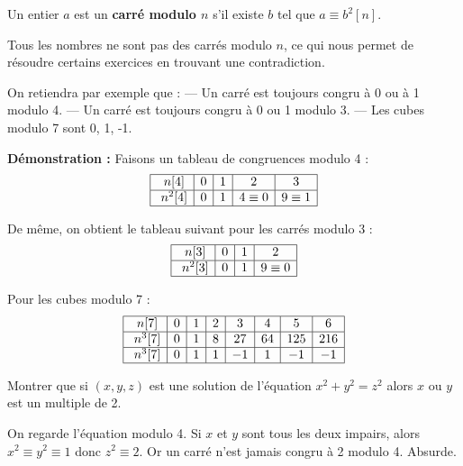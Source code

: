 \begin{dfn}
Un entier $a$ est un \textbf{carré modulo $n$} s'il existe $b$ tel que $a \equiv b^2[n]$.
\end{dfn}

Tous les nombres ne sont pas des carrés modulo $n$, ce qui nous permet de résoudre certains exercices en trouvant une contradiction.

\smallskip
On retiendra par exemple que :
\newline
— Un carré est toujours congru à 0 ou à 1 modulo 4.
\newline
— Un carré est toujours congru à 0 ou 1 modulo 3.
\newline
— Les cubes modulo 7 sont 0, 1, -1.

\bigskip
\textbf{Démonstration :}
\newline
Faisons un tableau de congruences modulo 4 :
$$\begin{array}{|c|c|c|c|c|}
\hline
\ n[4]&0&1&2&3 \\
\hline\ n^2[4]&0&1&4\equiv0&9\equiv1 \\
\hline
\end{array}$$
\newline

De même, on obtient le tableau suivant pour les carrés modulo 3 :
$$\begin{array}{|c|c|c|c|}
\hline
\ n[3]&0&1&2 \\
\hline\ n^2[3]&0&1&9\equiv0 \\
\hline
\end{array}$$
\newline

Pour les cubes modulo 7 :
$$\begin{array}{|c|c|c|c|c|c|c|c|}
\hline
\ n[7]&0&1&2&3&4&5&6 \\
\hline\ n^3[7]&0&1&8&27&64&125&216 \\
\hline\ n^3[7]&0&1&1&-1&1&-1&-1 \\
\hline
\end{array}$$

\begin{ex}
Montrer que si $(x, y, z)$ est une solution de l’équation $x^2+y^2=z^2$ alors $x$ ou $y$ est un multiple de 2.
\smallskip
\newline

On regarde l’équation modulo 4. Si $x$ et $y$ sont tous les deux impairs, alors $x^2\equiv y^2\equiv 1$ donc $z^2\equiv 2$. Or un carré n'est jamais congru à 2 modulo 4. Absurde.
\end{ex}

